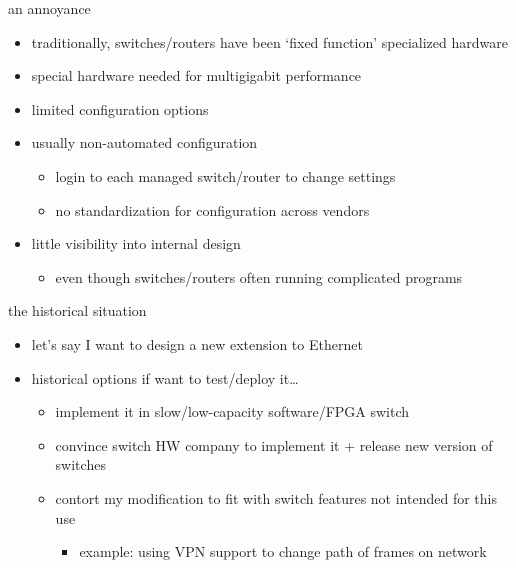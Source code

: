 \begin{frame}{an annoyance}
    \begin{itemize}
    \item traditionally, switches/routers have been `fixed function' specialized hardware
    \vspace{.5cm}
    \item special hardware needed for multigigabit performance
    \item limited configuration options
    \item usually non-automated configuration
        \begin{itemize}
        \item login to each managed switch/router to change settings
        \item no standardization for configuration across vendors
        \end{itemize}
    \item little visibility into internal design
        \begin{itemize}
        \item even though switches/routers often running complicated programs
        \end{itemize}
    \end{itemize}
\end{frame}

\begin{frame}{the historical situation}
    \begin{itemize}
    \item let's say I want to design a new extension to Ethernet
    \vspace{.5cm}
    \item historical options if want to test/deploy it\ldots
        \begin{itemize}
        \item implement it in slow/low-capacity software/FPGA switch
        \item convince switch HW company to implement it + release new version of switches
        \item contort my modification to fit with switch features not intended for this use
            \begin{itemize}
            \item example: using VPN support to change path of frames on network
            \end{itemize}
        \end{itemize}
    \end{itemize}
\end{frame}

